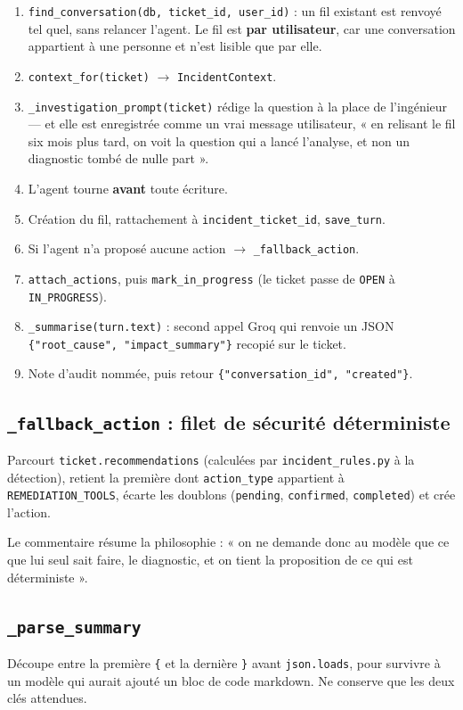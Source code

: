\documentclass[11pt,a4paper]{report}
\newcommand{\file}[1]{\texttt{\small #1}}
\newcommand{\fn}[1]{\texttt{\small\textcolor{oasisviolet}{#1}}}
\newcommand{\cls}[1]{\texttt{\small\textcolor{oasisblue}{#1}}}
\newcommand{\arrowto}{\ensuremath{\rightarrow}}
\begin{document}
\begin{enumerate}
  \item \fn{find\_conversation(db, ticket\_id, user\_id)} : un fil existant est
  renvoyé tel quel, sans relancer l'agent. Le fil est \textbf{par utilisateur},
  car une conversation appartient à une personne et n'est lisible que par elle.
  \item \fn{context\_for(ticket)} \arrowto{} \cls{IncidentContext}.
  \item \fn{\_investigation\_prompt(ticket)} rédige la question à la place de
  l'ingénieur --- et elle est enregistrée comme un vrai message utilisateur,
  « en relisant le fil six mois plus tard, on voit la question qui a lancé
  l'analyse, et non un diagnostic tombé de nulle part ».
  \item L'agent tourne \textbf{avant} toute écriture.
  \item Création du fil, rattachement à \texttt{incident\_ticket\_id},
  \fn{save\_turn}.
  \item Si l'agent n'a proposé aucune action \arrowto{} \fn{\_fallback\_action}.
  \item \fn{attach\_actions}, puis \fn{mark\_in\_progress} (le ticket passe de
  \texttt{OPEN} à \texttt{IN\_PROGRESS}).
  \item \fn{\_summarise(turn.text)} : second appel Groq qui renvoie un JSON
  \texttt{\{"root\_cause", "impact\_summary"\}} recopié sur le ticket.
  \item Note d'audit nommée, puis retour \texttt{\{"conversation\_id",
  "created"\}}.
\end{enumerate}

\subsection*{\fn{\_fallback\_action} : filet de sécurité déterministe}
Parcourt \texttt{ticket.recommendations} (calculées par
\file{incident\_rules.py} à la détection), retient la première dont
\texttt{action\_type} appartient à \texttt{REMEDIATION\_TOOLS}, écarte les
doublons (\texttt{pending}, \texttt{confirmed}, \texttt{completed}) et crée
l'action.

\begin{infobox}
Le commentaire résume la philosophie : « on ne demande donc au modèle que ce que
lui seul sait faire, le diagnostic, et on tient la proposition de ce qui est
déterministe ».
\end{infobox}

\subsection*{\fn{\_parse\_summary}}
Découpe entre la première \texttt{\{} et la dernière \texttt{\}} avant
\texttt{json.loads}, pour survivre à un modèle qui aurait ajouté un bloc de code
markdown. Ne conserve que les deux clés attendues.
\end{document}
